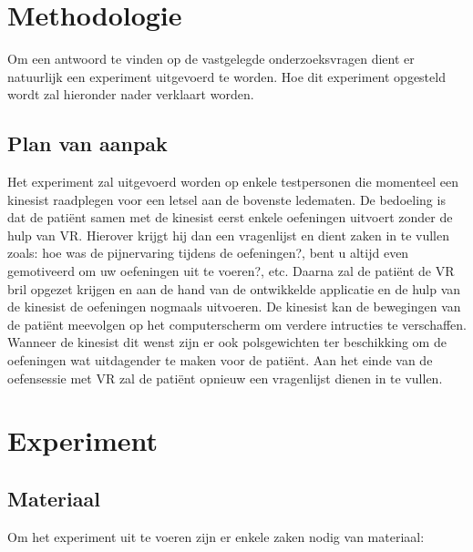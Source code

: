 
\chapter{Methodologie}
\label{ch:methodologie}


Om een antwoord te vinden op de vastgelegde onderzoeksvragen dient er natuurlijk een experiment uitgevoerd te worden. Hoe dit experiment opgesteld wordt zal hieronder nader verklaart worden.

\section{Plan van aanpak}
Het experiment zal uitgevoerd worden op enkele testpersonen die momenteel een kinesist raadplegen voor een letsel aan de bovenste ledematen. De bedoeling is dat de patiënt samen met de kinesist eerst enkele oefeningen uitvoert zonder de hulp van VR. Hierover krijgt hij dan een vragenlijst en dient zaken in te vullen zoals: hoe was de pijnervaring tijdens de oefeningen?, bent u altijd even gemotiveerd om uw oefeningen uit te voeren?, etc. Daarna zal de patiënt de VR bril opgezet krijgen en aan de hand van de ontwikkelde applicatie en de hulp van de kinesist de oefeningen nogmaals uitvoeren. De kinesist kan de bewegingen van de patiënt meevolgen op het computerscherm om verdere intructies te verschaffen. Wanneer de kinesist dit wenst zijn er ook polsgewichten ter beschikking om de oefeningen wat uitdagender te maken voor de patiënt. Aan het einde van de oefensessie met VR zal de patiënt opnieuw een vragenlijst dienen in te vullen.


\chapter{Experiment}

\section{Materiaal}
Om het experiment uit te voeren zijn er enkele zaken nodig van materiaal:

